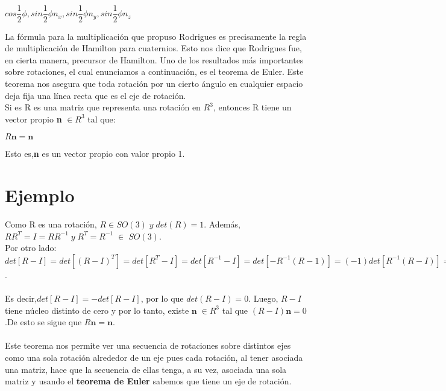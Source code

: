 \documentclass[12pt,a4paper]{report}
\begin{document}
\\\begin{center}
$cos\dfrac{1}{2}\phi,sin\dfrac{1}{2}\phi n_{x},sin\dfrac{1}{2}\phi n_{y},sin\dfrac{1}{2}\phi n_{z}$\\\end{center}
La fórmula para la multiplicación que propuso Rodrigues es precisamente la regla de multiplicación de Hamilton para cuaternios. Esto nos dice que Rodrigues fue, en cierta manera, precursor de Hamilton. Uno de los resultados más importantes sobre rotaciones, el cual enunciamos a continuación, es el teorema de Euler. Este teorema nos asegura que toda rotación por un cierto ángulo en cualquier espacio deja fija una línea recta que es el eje de rotación.\\Si es R es una matriz que representa una rotación en $R^{3}$, entonces R tiene un vector propio \textbf{n} $\in R^{3}$ tal que:
\begin{center}
$R\textbf{n}=\textbf{n}$\end{center}
Esto es,\textbf{n} es un vector propio con valor propio 1.
\section{Ejemplo}
Como R es una rotación, $R\in SO(3)\;y \;det(R)=1$.
Además,\;$RR^{T}=I=RR^{-1}\; y \;R^{T}=R^{-1}\; \in\;SO(3)$.\\
Por otro lado:\\
$det[R-I]=det[(R-I)^{T}]=det[R^{T}-I]=det[R^{-1}-I]=det[-R^{-1}(R-1)]=(-1)det[R^{-1}(R-I)]=-det[R^{-1}]det[R-1=-det[R-I]$.\\\\
Es decir,$det[R-I]=-det[R-I]$, por lo que $det(R-I)=0$.
Luego, $R-I$ tiene núcleo distinto de cero y por lo tanto, existe $\textbf{n}\;\in R^{3}$ tal que $(R-I)\textbf{n}=0$.De esto se sigue que $R\textbf{n}=\textbf{n}$.\\\\
Este teorema nos permite ver una secuencia de rotaciones sobre distintos ejes como una sola rotación alrededor de un eje pues cada rotación, al tener asociada una matriz, hace que la secuencia de ellas tenga, a su vez, asociada una sola matriz y usando el \textbf{teorema de Euler} sabemos que tiene un eje de rotación.
\end{document}
